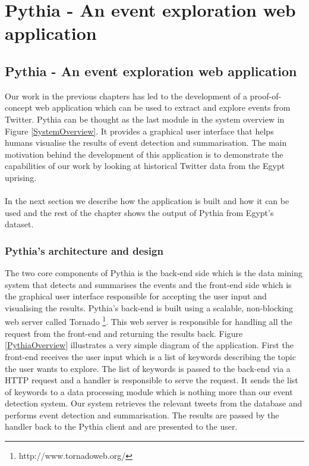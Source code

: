 \chapter{Pythia - An event exploration web application}\label{Pythia}
\ifpdf
    \graphicspath{{Chapter5/Chapter5Figs/PNG/}{Chapter5/Chapter5Figs/PDF/}{Chapter5/Chapter5Figs/}}
\else
    \graphicspath{{Chapter5/Chapter5Figs/EPS/}{Chapter5/Chapter5Figs/}}
\fi

\section{Pythia - An event exploration web application}\label{WebApp}
Our work in the previous chapters has led to the development of a proof-of-concept web application which can be used to extract and explore
events from Twitter. Pythia can be thought as the last module in the system overview in Figure \ref{SystemOverview}. It provides a graphical user interface that helps humans visualise the results of event detection and summarisation. The main motivation behind the development of this application is to demonstrate the capabilities of our work by looking at historical Twitter data from the Egypt uprising.\\\\
In the next section we describe how the application is built and how it can be used and the rest of the chapter shows the output of Pythia from Egypt's dataset.    

\subsection{Pythia's architecture and design}
The two core components of Pythia is the back-end side which is the data mining system that detects and summarises the events and the front-end side which is the graphical user interface responsible for accepting the user input and visualising the results. Pythia's back-end is built using a scalable, non-blocking web server called Tornado \footnote{http://www.tornadoweb.org/}. This web server is responsible for handling all the request from the front-end and returning the results back. Figure \ref{PythiaOverview} illustrates a very simple diagram of the application. First the front-end receives the user input which is a list of keywords describing the topic the user wants to explore. The list of keywords is passed to the back-end via a HTTP request and a handler is responsible to serve the request. It sends the list of keywords to a data processing module which is nothing more than our event detection system. Our system retrieves the relevant tweets from the database and performs event detection and summarisation. The results are passed by the handler back to the Pythia client and are presented to the user. 

